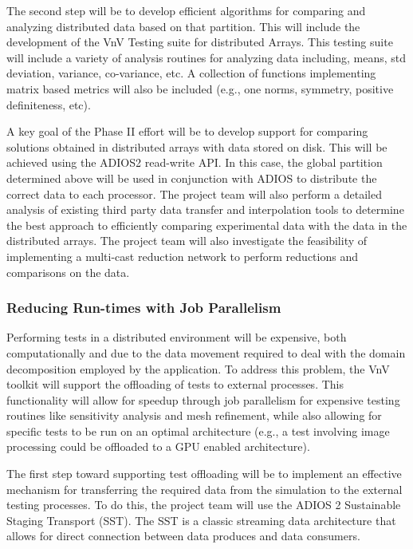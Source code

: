 The second step will be to develop efficient algorithms for comparing and analyzing distributed data based on that partition. This will include the development of the VnV Testing suite for distributed Arrays. This testing suite will include a variety of analysis routines for analyzing data including, means, std deviation, variance, co-variance, etc. A collection of functions implementing matrix based metrics will also be included (e.g., one norms, symmetry, positive definiteness, etc). 

A key goal of the Phase II effort will be to develop support for comparing solutions obtained in distributed arrays with data stored on disk. This will be achieved using the ADIOS2 read-write API. In this case, the global partition determined above will be used in conjunction with ADIOS to distribute the correct data to each processor. The project team will also perform a detailed analysis of existing third party data transfer and interpolation tools to determine the best approach to efficiently comparing experimental data with the data in the distributed arrays. The project team will also investigate the feasibility of implementing a multi-cast reduction network to perform reductions and comparisons on the data.

\subsubsection{Reducing Run-times with Job Parallelism}

Performing \VV tests in a distributed environment will be expensive, both computationally and due to the data movement required to deal with the domain decomposition employed by the application. To address this problem, the VnV toolkit will support the offloading of tests to external processes. This functionality will allow for speedup through job parallelism for expensive testing routines like sensitivity analysis and mesh refinement, while also allowing for specific tests to be run on an optimal architecture (e.g., a test involving image processing could be offloaded to a GPU enabled architecture).  

The first step toward supporting test offloading will be to implement an effective mechanism for transferring the required 
data from the simulation to the external testing processes. To do this, the project team will use the ADIOS 2 Sustainable Staging Transport (SST). The SST is a classic streaming data architecture that allows for direct connection between data produces and data consumers. 

